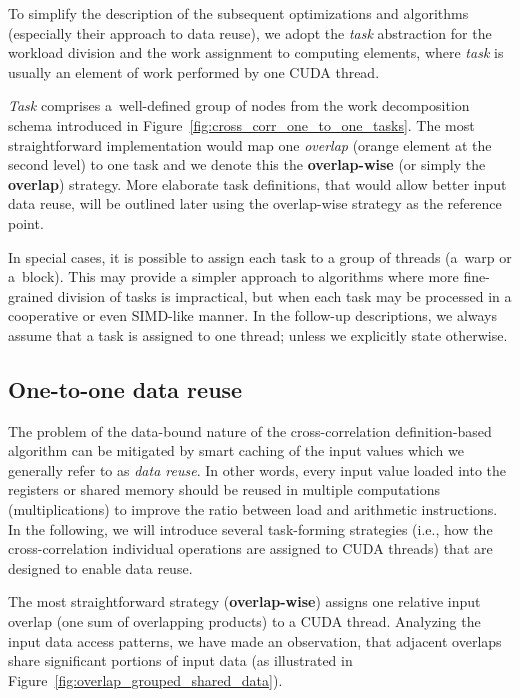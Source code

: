To simplify the description of the subsequent optimizations and algorithms (especially their approach to data reuse), we adopt the \emph{task} abstraction for the workload division and the work assignment to computing elements, where \emph{task} is usually an element of work performed by one CUDA thread.

\emph{Task} comprises a~well-defined group of nodes from the work decomposition schema introduced in Figure~\ref{fig:cross_corr_one_to_one_tasks}. The most straightforward implementation would map one \emph{overlap} (orange element at the second level) to one task and we denote this the \textbf{overlap-wise} (or simply the \textbf{overlap}) strategy. More elaborate task definitions, that would allow better input data reuse, will be outlined later using the overlap-wise strategy as the reference point.

In special cases, it is possible to assign each task to a group of threads (a~warp or a~block). This may provide a simpler approach to algorithms where more fine-grained division of tasks is impractical, but when each task may be processed in a cooperative or even SIMD-like manner. In the follow-up descriptions, we always assume that a task is assigned to one thread; unless we explicitly state otherwise.


\subsection{One-to-one data reuse}\label{sec:analysis-reuse}

The problem of the data-bound nature of the cross-correlation definition-based algorithm can be mitigated by smart caching of the input values which we generally refer to as \emph{data reuse}. In other words, every input value loaded into the registers or shared memory should be reused in multiple computations (multiplications) to improve the ratio between load and arithmetic instructions. In the following, we will introduce several task-forming strategies (i.e., how the cross-correlation individual operations are assigned to CUDA threads) that are designed to enable data reuse.

The most straightforward strategy (\textbf{overlap-wise}) assigns one relative input overlap (one sum of overlapping products) to a CUDA thread. Analyzing the input data access patterns, we have made an observation, that adjacent overlaps share significant portions of input data (as illustrated in Figure~\ref{fig:overlap_grouped_shared_data}).

